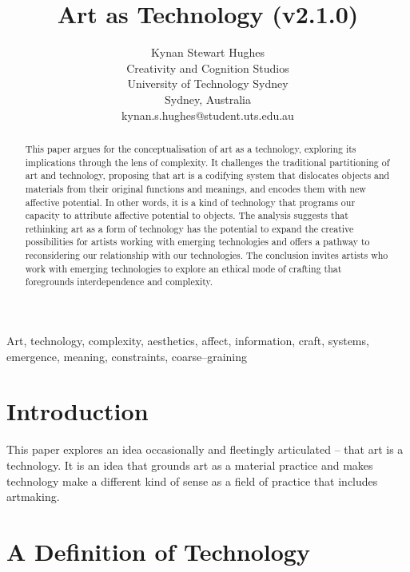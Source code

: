 \documentclass[letter:wpaper]{article}
\title{Art as Technology (v2.1.0)}
\author{Kynan Stewart Hughes\\
Creativity and Cognition Studios\\
University of Technology Sydney\\
Sydney, Australia\\
kynan.s.hughes@student.uts.edu.au\\
\newline
\newline
}
\begin{document}
 
\maketitle
\begin{abstract}

    This paper argues for the conceptualisation of art as a technology, exploring its implications through the lens of complexity. It challenges the traditional partitioning of art and technology, proposing that art is a codifying system that dislocates objects and materials from their original functions and meanings, and encodes them with new affective potential. In other words, it is a kind of technology that programs our capacity to attribute affective potential to objects. The analysis suggests that rethinking art as a form of technology has the potential to expand the creative possibilities for artists working with emerging technologies and offers a pathway to reconsidering our relationship with our technologies. The conclusion invites artists who work with emerging technologies to explore an ethical mode of crafting that foregrounds interdependence and complexity.

\end{abstract}


Art, technology, complexity, aesthetics, affect, information, craft, systems, emergence, meaning, constraints, coarse–graining

\section{Introduction}

    This paper explores an idea occasionally \citep[pp.74–75]{SauvagnarguesArtmchns2016} \citep{GellThTchnlgyOfEnchntmnt1992} and fleetingly \citep[p.202]{ZepkeOSullivanDlzCntmprryArt2010} articulated – that art is a technology. It is an idea that grounds art as a material practice and makes technology make a different kind of sense as a field of practice that includes artmaking. 
    
\section{A Definition of Technology} 
\end{document}
